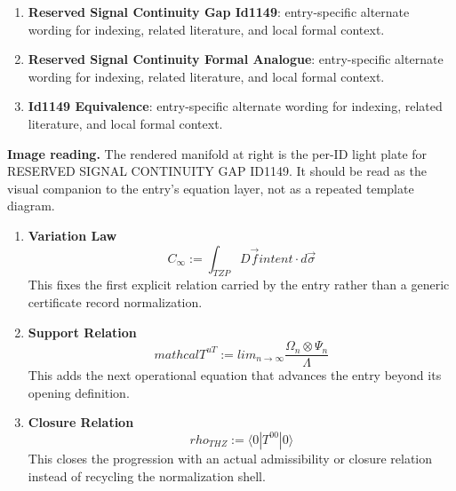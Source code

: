 \begin{enumerate}[leftmargin=1.6em,itemsep=6pt,topsep=4pt]
\item \textbf{Reserved Signal Continuity Gap Id1149}: entry-specific alternate wording for indexing, related literature, and local formal context.
\item \textbf{Reserved Signal Continuity Formal Analogue}: entry-specific alternate wording for indexing, related literature, and local formal context.
\item \textbf{Id1149 Equivalence}: entry-specific alternate wording for indexing, related literature, and local formal context.
\end{enumerate}

\begin{samepage}
\noindent\begin{minipage}[t]{0.45\linewidth}
\vspace{0pt}
\raggedright
\scriptsize\textbf{Image reading.} The rendered manifold at right is the per-ID light plate for RESERVED SIGNAL CONTINUITY GAP ID1149. It should be read as the visual companion to the entry's equation layer, not as a repeated template diagram.\par
\end{minipage}\hfill
\begin{minipage}[t]{0.53\linewidth}
\vspace*{-0.10in}
\raggedright
{}
\end{minipage}
\end{samepage}

\clearpage


\begin{enumerate}[leftmargin=1.6em,itemsep=9pt,topsep=6pt]
\item \textbf{Variation Law}
\[
C_{\infty} := \int_{TZP} D \vec{f} {intent} \cdot d\vec{\sigma}
\]
This fixes the first explicit relation carried by the entry rather than a generic certificate record normalization.

\item \textbf{Support Relation}
\[
mathcal{T}^{uT}:=lim_{n\rightarrow\infty}\frac{\Omega_{n}\otimes\Psi_{n}}{\Lambda}
\]
This adds the next operational equation that advances the entry beyond its opening definition.

\item \textbf{Closure Relation}
\[
rho_{THZ}:=\langle0|T^{00}|0\rangle
\]
This closes the progression with an actual admissibility or closure relation instead of recycling the normalization shell.
\end{enumerate}

